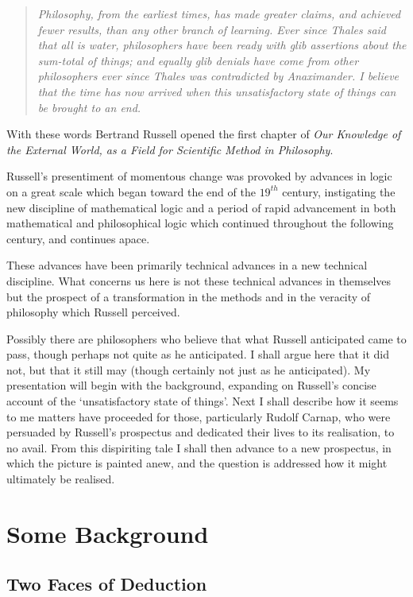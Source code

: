 
\begin{quote}
\emph{
Philosophy, from the earliest times, has made greater claims, and achieved fewer results, than any other branch of learning. Ever since Thales said that all is water, philosophers have been ready with glib assertions about the sum-total of things; and equally glib denials have come from other philosophers ever since Thales was contradicted by Anaximander. I believe that the time has now arrived when this unsatisfactory state of things can be brought to an end.}
\end{quote}
With these words Bertrand Russell opened the first chapter of \emph{Our Knowledge of the External World, as a Field for Scientific Method in Philosophy}\cite{russell1921}.

Russell's presentiment of momentous change was provoked by advances in logic on a great scale which began toward the end of the $19^{th}$ century, instigating the new discipline of mathematical logic and a period of rapid advancement in both mathematical and philosophical logic which continued throughout the following century, and continues apace.

These advances have been primarily technical advances in a new technical discipline.
What concerns us here is not these technical advances in themselves but the prospect of a transformation in the methods and in the veracity of philosophy which Russell perceived.

Possibly there are philosophers who believe that what Russell anticipated came to pass, though perhaps not quite as he anticipated.
I shall argue here that it did not, but that it still may (though certainly not just as he anticipated).
My presentation will begin with the background, expanding on Russell's concise account of the `unsatisfactory state of things'.
Next I shall describe how it seems to me matters have proceeded for those, particularly Rudolf Carnap, who were persuaded by Russell's prospectus and dedicated their lives to its realisation, to no avail.
From this dispiriting tale I shall then advance to a new prospectus, in which the picture is painted anew, and the question is addressed how it might ultimately be realised.

\section{Some Background}

\subsection{Two Faces of Deduction}

